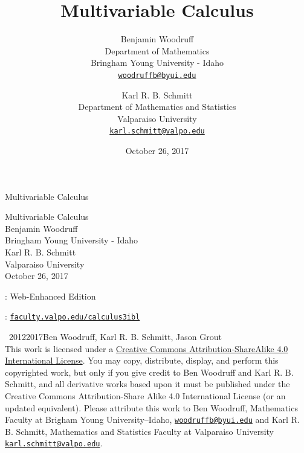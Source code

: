 \documentclass[10pt,]{book}
\title{Multivariable Calculus}
\author{Benjamin Woodruff\\
Department of Mathematics\\
Bringham Young University - Idaho\\
\href{mailto:woodruffb@byui.edu}{\nolinkurl{woodruffb@byui.edu}}
\and
Karl R. B. Schmitt\\
Department of Mathematics and Statistics \\
Valparaiso University\\
\href{mailto:karl.schmitt@valpo.edu}{\nolinkurl{karl.schmitt@valpo.edu}}
}
\date{October 26, 2017}
\theoremstyle{plain}
\theoremstyle{definition}
\theoremstyle{definition}
\theoremstyle{definition}
\theoremstyle{definition}
\theoremstyle{definition}
\numberwithin{equation}{section}
\begin{document}
\frontmatter
\thispagestyle{empty}
{\centering
\vspace*{0.28\textheight}
{\Huge Multivariable Calculus}\\}
\clearpage
\thispagestyle{empty}
\null%
\clearpage
\thispagestyle{empty}
{\centering
\vspace*{0.14\textheight}
{\Huge Multivariable Calculus}\\[3\baselineskip]
{\Large Benjamin Woodruff}\\[0.5\baselineskip]
{\Large Bringham Young University - Idaho}\\[3\baselineskip]
{\Large Karl R. B. Schmitt}\\[0.5\baselineskip]
{\Large Valparaiso University}\\[3\baselineskip]
{\Large October 26, 2017}\\}
\clearpage
\thispagestyle{empty}
: Web-Enhanced Edition\par\medskip
{}: \href{http://faculty.valpo.edu/calculus3ibl}{\lstinline?faculty.valpo.edu/calculus3ibl?}\par\medskip
\noindent\textcopyright\ 2012\textendash{}2017\quad{}Ben Woodruff, Karl R. B. Schmitt, Jason Grout\\[0.5\baselineskip]
 This work is licensed under a \href{http://creativecommons.org/licenses/by-sa/4.0/}{Creative Commons Attribution-ShareAlike 4.0 International License}. You may copy, distribute, display, and perform this copyrighted work, but only if you give credit to Ben Woodruff and Karl R. B. Schmitt, and all derivative works based upon it must be published under the Creative Commons Attribution-Share Alike 4.0 International License (or an updated equivalent). Please attribute this work to Ben Woodruff, Mathematics Faculty at Brigham Young University--Idaho, \href{mailto:woodruffb@byui.edu}{\nolinkurl{woodruffb@byui.edu}} and Karl R. B. Schmitt, Mathematics and Statistics Faculty at Valparaiso University \href{mailto:karl.schmitt@valpo.edu}{\nolinkurl{karl.schmitt@valpo.edu}}.\par\medskip
{}
\null\clearpage
\end{document}
